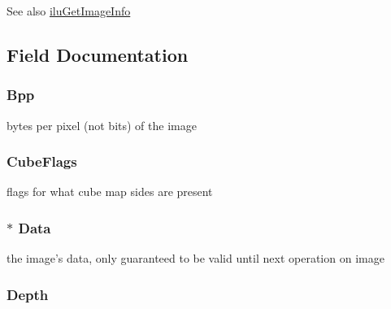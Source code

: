 \begin{DoxySeeAlso}{See also}
\hyperlink{group__ilu__util_ga2dba9fc87a5d05e1401cd5fa08cd5728}{ilu\+Get\+Image\+Info} 
\end{DoxySeeAlso}


\subsection{Field Documentation}
\hypertarget{struct_i_l_uinfo_acb619433784a0e26c0f1f18b3700c9f7}{
\subsubsection[{Bpp}]{ Bpp}}\label{struct_i_l_uinfo_acb619433784a0e26c0f1f18b3700c9f7}


bytes per pixel (not bits) of the image 

\hypertarget{struct_i_l_uinfo_a2141dcf3ce36303a8c31d417d9337034}{
\subsubsection[{Cube\+Flags}]{ Cube\+Flags}}\label{struct_i_l_uinfo_a2141dcf3ce36303a8c31d417d9337034}


flags for what cube map sides are present 

\hypertarget{struct_i_l_uinfo_a32fd28ac5d89e3ef2f9151330af0149d}{
\subsubsection[{Data}]{$\ast$ Data}}\label{struct_i_l_uinfo_a32fd28ac5d89e3ef2f9151330af0149d}


the image's data, only guaranteed to be valid until next operation on image 

\hypertarget{struct_i_l_uinfo_a2a4c47a9713bee335a0830b336bdc951}{
\subsubsection[{Depth}]{ Depth}}\label{struct_i_l_uinfo_a2a4c47a9713bee335a0830b336bdc951}


